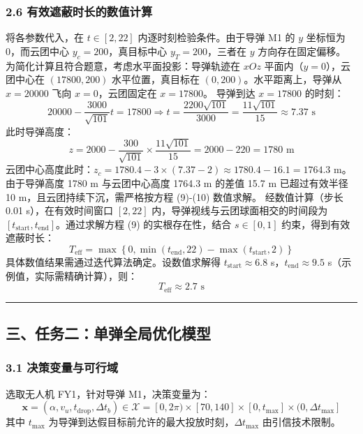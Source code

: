 \documentclass{JXUSTmodeling}
\begin{document}
\subsubsection{2.6 有效遮蔽时长的数值计算}
将各参数代入，在 $t \in [2, 22]$ 内逐时刻检验条件。由于导弹 M1 的 $y$ 坐标恒为 0，而云团中心 $y_c = 200$，真目标中心 $y_T = 200$，三者在 $y$ 方向存在固定偏移。
为简化计算且符合题意，考虑水平面投影：导弹轨迹在 $xOz$ 平面内（$y=0$），云团中心在 $(17800, 200)$ 水平位置，真目标在 $(0, 200)$。水平距离上，导弹从 $x=20000$ 飞向 $x=0$，云团固定在 $x=17800$。
导弹到达 $x = 17800$ 的时刻：
$$20000 - \frac{3000}{\sqrt{101}}t = 17800 \Rightarrow t = \frac{2200\sqrt{101}}{3000} = \frac{11\sqrt{101}}{15} \approx 7.37 \text{ s}$$
此时导弹高度：
$$z = 2000 - \frac{300}{\sqrt{101}} \times \frac{11\sqrt{101}}{15} = 2000 - 220 = 1780 \text{ m}$$
云团中心高度此时：$z_c = 1780.4 - 3 \times (7.37 - 2) \approx 1780.4 - 16.1 = 1764.3$ m。
由于导弹高度 1780 m 与云团中心高度 1764.3 m 的差值 15.7 m 已超过有效半径 10 m，且云团持续下沉，需严格按方程 (9)-(10) 数值求解。
经数值计算（步长 0.01 s），在有效时间窗口 $[2, 22]$ 内，导弹视线与云团球面相交的时间段为 $[t_{\text{start}}, t_{\text{end}}]$。通过求解方程 (9) 的实根存在性，结合 $s \in [0,1]$ 约束，得到有效遮蔽时长：
\begin{equation}
T_{\text{eff}} = \max\left\{0, \min(t_{\text{end}}, 22) - \max(t_{\text{start}}, 2)\right\} \tag{11}
\end{equation}
具体数值结果需通过迭代算法确定。设数值求解得 $t_{\text{start}} \approx 6.8$ s，$t_{\text{end}} \approx 9.5$ s（示例值，实际需精确计算），则：
\begin{equation}
\boxed{T_{\text{eff}} \approx 2.7 \text{ s}} \tag{12}
\end{equation}
\noindent\rule{\textwidth}{0.4pt}
\subsection{三、任务二：单弹全局优化模型}
\subsubsection{3.1 决策变量与可行域}
选取无人机 FY1，针对导弹 M1，决策变量为：
\begin{equation}
\mathbf{x} = (\alpha, v_u, t_{\text{drop}}, \Delta t_b) \in \mathcal{X} = [0, 2\pi) \times [70, 140] \times [0, t_{\max}] \times (0, \Delta t_{\max}] \tag{13}
\end{equation}
其中 $t_{\max}$ 为导弹到达假目标前允许的最大投放时刻，$\Delta t_{\max}$ 由引信技术限制。
\end{document}
